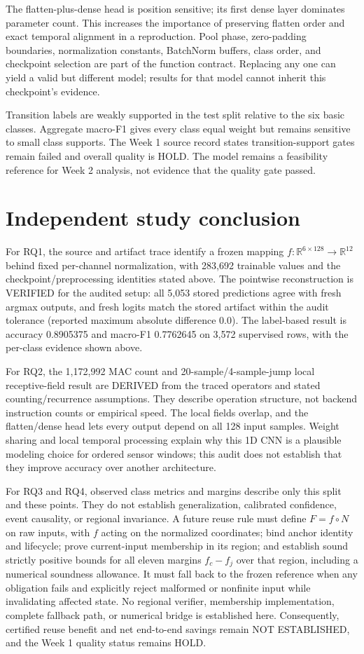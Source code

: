 \documentclass[11pt,a4paper]{article}
\newcommand{\R}{\mathbb R}\newcommand{\relu}{\operatorname{ReLU}}
\begin{document}
The flatten-plus-dense head is position sensitive; its first dense layer dominates parameter count. This increases the importance of preserving flatten order and exact temporal alignment in a reproduction. Pool phase, zero-padding boundaries, normalization constants, BatchNorm buffers, class order, and checkpoint selection are part of the function contract. Replacing any one can yield a valid but different model; results for that model cannot inherit this checkpoint's evidence.

Transition labels are weakly supported in the test split relative to the six basic classes. Aggregate macro-F1 gives every class equal weight but remains sensitive to small class supports. The Week 1 source record states transition-support gates remain failed and overall quality is HOLD. The model remains a feasibility reference for Week 2 analysis, not evidence that the quality gate passed.

\section{Independent study conclusion}
For RQ1, the source and artifact trace identify a frozen mapping $f:\R^{6\times128}\to\R^{12}$ behind fixed per-channel normalization, with 283,692 trainable values and the checkpoint/preprocessing identities stated above. The pointwise reconstruction is VERIFIED for the audited setup: all 5,053 stored predictions agree with fresh argmax outputs, and fresh logits match the stored artifact within the audit tolerance (reported maximum absolute difference 0.0). The label-based result is accuracy 0.8905375 and macro-F1 0.7762645 on 3,572 supervised rows, with the per-class evidence shown above.

For RQ2, the 1,172,992 MAC count and 20-sample/4-sample-jump local receptive-field result are DERIVED from the traced operators and stated counting/recurrence assumptions. They describe operation structure, not backend instruction counts or empirical speed. The local fields overlap, and the flatten/dense head lets every output depend on all 128 input samples. Weight sharing and local temporal processing explain why this 1D CNN is a plausible modeling choice for ordered sensor windows; this audit does not establish that they improve accuracy over another architecture.

For RQ3 and RQ4, observed class metrics and margins describe only this split and these points. They do not establish generalization, calibrated confidence, event causality, or regional invariance. A future reuse rule must define $F=f\circ N$ on raw inputs, with $f$ acting on the normalized coordinates; bind anchor identity and lifecycle; prove current-input membership in its region; and establish sound strictly positive bounds for all eleven margins $f_c-f_j$ over that region, including a numerical soundness allowance. It must fall back to the frozen reference when any obligation fails and explicitly reject malformed or nonfinite input while invalidating affected state. No regional verifier, membership implementation, complete fallback path, or numerical bridge is established here. Consequently, certified reuse benefit and net end-to-end savings remain NOT ESTABLISHED, and the Week 1 quality status remains HOLD.
\end{document}
